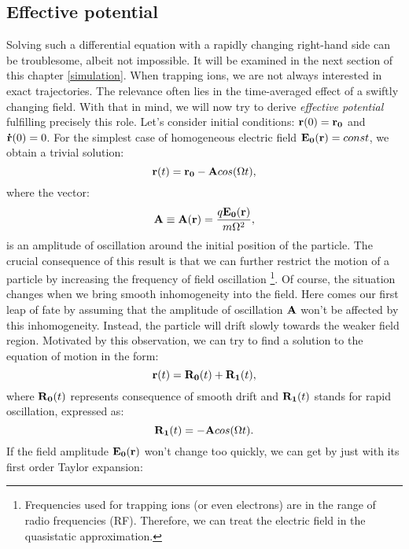 	\subsection{Effective potential}
Solving such a differential equation with a rapidly changing right-hand side can be troublesome, albeit not impossible. It will be examined in the next section of this chapter \ref{simulation}. When trapping ions, we are not always interested in exact trajectories. The relevance often lies in the time-averaged effect of a swiftly changing field. With that in mind, we will now try to derive \emph{effective potential} fulfilling precisely this role.
Let's consider initial conditions: $\vb{r}(0) = \vb{r_0}$ and $\vb{\dot{r}}(0) = 0$. For the simplest case of homogeneous electric field $\vb{E_0}(\vb{r}) = const$, we obtain a trivial solution:
\begin{equation}
	\label{solution for homogenious field}
	\vb{r}(t) = \vb{r_0} - \vb{A} cos(\Omega t),
\end{equation}
where the vector: 
\begin{equation}
	\label{oscillation amplitude}
	\vb{A} \equiv \vb{A}(\vb{r}) = \frac{q \vb{E_0}(\vb{r})}{m \Omega^2},
\end{equation}
is an amplitude of oscillation around the initial position of the particle. The crucial consequence of this result is that we can further restrict the motion of a particle by increasing the frequency of field oscillation \footnote{Frequencies used for trapping ions (or even electrons) are in the range of radio frequencies (RF). Therefore, we can treat the electric field in the quasistatic approximation.}. Of course, the situation changes when we bring smooth inhomogeneity into the field. Here comes our first leap of fate by assuming that the amplitude of oscillation $\vb{A}$ won't be affected by this inhomogeneity. Instead, the particle will drift slowly towards the weaker field region. Motivated by this observation, we can try to find a solution to the equation of motion in the form:
\begin{equation}
	\label{motion separation}
	\vb{r}(t) = \vb{R_0}(t) + \vb{R_1}(t),
\end{equation}
where $\vb{R_0}(t)$ represents consequence of smooth drift and $\vb{R_1}(t)$ stands for rapid oscillation, expressed as:
\begin{equation}
	\label{oscillation motion}
	\vb{R_1}(t) = - \vb{A} cos(\Omega t).
\end{equation}
If the field amplitude $\vb{E_0}(\vb{r})$ won't change too quickly, we can get by just with its first order Taylor expansion:
